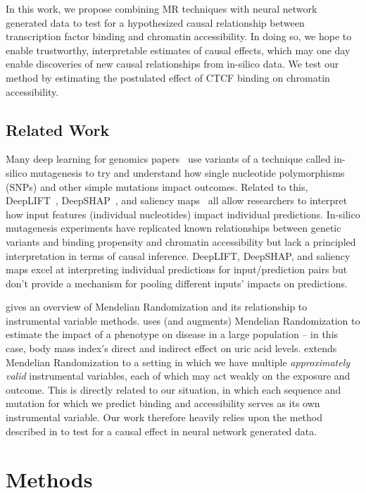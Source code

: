 \documentclass{article}
\begin{document}
In this work, we propose combining MR techniques with neural network generated data to test for a hypothesized causal relationship between transcription factor binding and chromatin accessibility. In doing so, we hope to enable trustworthy, interpretable estimates of causal effects, which may one day enable discoveries of new causal relationships from in-silico data. We test our method by estimating the postulated effect of CTCF binding on chromatin accessibility.

\subsection{Related Work}
Many deep learning for genomics papers~\cite{kelley2016basset, zhou2015predicting, koo2018inferring} use variants of a technique called in-silico mutagenesis to try and understand how single nucleotide polymorphisms (SNPs) and other simple mutations impact outcomes. Related to this, DeepLIFT~\cite{shrikumar2017learning}, DeepSHAP~\cite{lundberg2017unified}, and saliency maps~\cite{simonyan2013deep} all allow researchers to interpret how input features (individual nucleotides) impact individual predictions. In-silico mutagenesis experiments have replicated known relationships between genetic variants and binding propensity and chromatin accessibility but lack a principled interpretation in terms of causal inference. DeepLIFT, DeepSHAP, and saliency maps excel at interpreting individual predictions for input/prediction pairs but don't provide a mechanism for pooling different inputs' impacts on predictions.

\citet{Didelez2007-vs} gives an overview of Mendelian Randomization and its relationship to instrumental variable methods. \citet{burgess2014network} uses (and augments) Mendelian Randomization to estimate the impact of a phenotype on disease in a large population -- in this case, body mass index's direct and indirect effect on uric acid levels. \citet{zhao2018statistical} extends Mendelian Randomization to a setting in which we have multiple \textit{approximately valid} instrumental variables, each of which may act weakly on the exposure and outcome. This is directly related to our situation, in which each sequence and mutation for which we predict binding and accessibility serves as its own instrumental variable. Our work therefore heavily relies upon the method described in \cite{zhao2018statistical} to test for a causal effect in neural network generated data.

\section{Methods}
\end{document}
